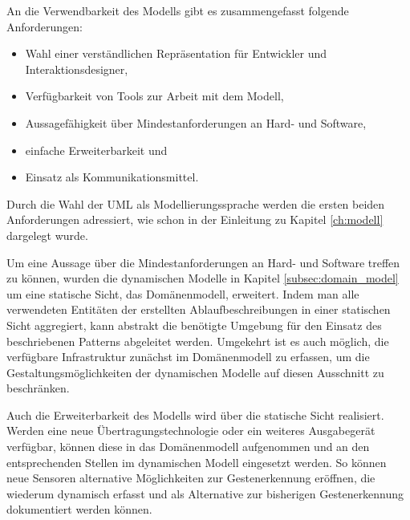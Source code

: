 An die Verwendbarkeit des Modells gibt es zusammengefasst folgende Anforderungen:
\begin{itemize}
\item Wahl einer verständlichen Repräsentation für Entwickler und Interaktionsdesigner,
\item Verfügbarkeit von Tools zur Arbeit mit dem Modell,
\item Aussagefähigkeit über Mindestanforderungen an Hard- und Software,
\item einfache Erweiterbarkeit und
\item Einsatz als Kommunikationsmittel.
\end{itemize}
Durch die Wahl der \acs{UML} als Modellierungssprache werden die ersten beiden Anforderungen adressiert, wie schon in der Einleitung zu Kapitel \ref{ch:modell} dargelegt wurde. 

Um eine Aussage über die Mindestanforderungen an Hard- und Software treffen zu können, wurden die dynamischen Modelle in Kapitel \ref{subsec:domain_model} um eine statische Sicht, das Domänenmodell, erweitert. Indem man alle verwendeten Entitäten der erstellten Ablaufbeschreibungen in einer statischen Sicht aggregiert, kann abstrakt die benötigte Umgebung für den Einsatz des beschriebenen Patterns abgeleitet werden. Umgekehrt ist es auch möglich, die verfügbare Infrastruktur zunächst im Domänenmodell zu erfassen, um die Gestaltungsmöglichkeiten der dynamischen Modelle auf diesen Ausschnitt zu beschränken.

Auch die Erweiterbarkeit des Modells wird über die statische Sicht realisiert. Werden \zb eine neue Übertragungstechnologie oder ein weiteres Ausgabegerät verfügbar, können diese in das Domänenmodell aufgenommen und an den entsprechenden Stellen im dynamischen Modell eingesetzt werden. So können \zb neue Sensoren alternative Möglichkeiten zur Gestenerkennung eröffnen, die wiederum dynamisch erfasst und als Alternative zur bisherigen Gestenerkennung dokumentiert werden können.

